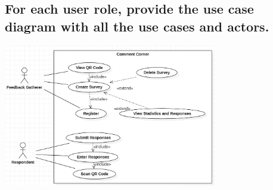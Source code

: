 \documentclass[letterpaper, 12 pt, conference]{ieeeconf}
\begin{document}

\subsection{For each user role, provide the use case diagram with all the use cases and actors.}
\includegraphics[width=0.70\textwidth]{caseDiagram.png}

\newpage
\end{document}
